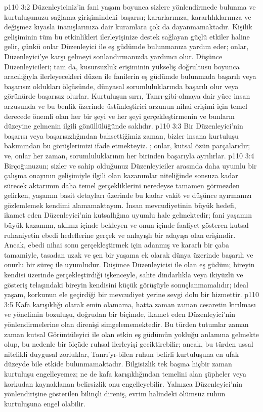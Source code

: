 \vs p110 3:2 Düzenleyiciniz’in fani yaşam boyunca sizlere yönlendirmede bulunma ve kurtuluşunuzu sağlama girişimindeki başarısı; kararlarınıza, kararlılıklarınıza ve değişmez  kıyasla inanışlarınıza dair kuramlara çok da dayanmamaktadır. Kişilik gelişiminin tüm bu etkinlikleri ilerleyişinize destek sağlayan güçlü etkiler haline gelir, çünkü onlar Düzenleyici ile eş güdümde bulunmanıza yardım eder; onlar, Düzenleyici’ye karşı gelmeyi sonlandırmanızda yardımcı olur. Düşünce Düzenleyicileri; tam da, kusursuzluk erişiminin yükseliş doğrultusu boyunca aracılığıyla ilerleyecekleri düzen ile fanilerin eş güdümde bulunmada başarılı veya başarısız oldukları ölçüsünde, dünyasal sorumluluklarında başarılı olur veya görünürde başarısız olurlar. Kurtuluşun sırrı, Tanrı\hyp{}gibi\hyp{}olmaya dair yüce insan arzusunda ve bu benlik üzerinde üstünleştirici arzunun nihai erişimi için temel derecede önemli olan her bir şeyi ve her şeyi gerçekleştirmenin ve bunların düzeyine gelmenin ilgili gönüllülüğünde saklıdır.
\vs p110 3:3 Bir Düzenleyici’nin başarısı veya başarısızlığından bahsettiğimiz zaman, bizler insana kurtuluşu bakımından bu görüşlerimizi ifade etmekteyiz. ; onlar, kutsal özün parçalarıdır; ve, onlar her zaman, sorumluluklarının her birinden başarıyla ayrılırlar.
\vs p110 3:4 Birçoğunuzun; sizler ve sahip olduğunuz Düzenleyiciler arasında daha uyumlu bir çalışma onayının gelişimiyle ilgili olan kazanımlar niteliğinde sonsuza kadar sürecek aktarımın daha temel gerçekliklerini neredeyse tamamen görmezden gelirken, yaşamın basit detayları üzerinde bu kadar vakit ve düşünce ayırmanızı gözlemlemek kendimi alamamaktayım. İnsan mevcudiyetinin büyük hedefi, ikamet eden Düzenleyici’nin kutsallığına uyumlu hale gelmektedir; fani yaşamın büyük kazanımı, aklınız içinde bekleyen ve onun içinde faaliyet gösteren kutsal ruhaniyetin ebedi hedeflerine gerçek ve anlayışlı bir adayışa olan erişimdir. Ancak, ebedi nihai sonu gerçekleştirmek için adanmış ve kararlı bir çaba tamamiyle, tasadan uzak ve şen bir yaşama ek olarak dünya üzerinde başarılı ve onurlu bir süreç ile uyumludur. Düşünce Düzenleyicisi ile olan eş güdüm; bireyin kendisi üzerinde gerçekleştirdiği işkenceyle, sahte dindarlıkla veya ikiyüzlü ve gösteriş telaşındaki bireyin kendisini küçük görüşüyle sonuçlanmamalıdır; ideal yaşam, korkunun ele geçirdiği bir mevcudiyet yerine sevgi dolu bir hizmettir.
\vs p110 3:5 Kafa karışıklığı olarak emin olamama, hatta zaman zaman cesaretin kırılması ve yönelimin bozuluşu, doğrudan bir biçimde, ikamet eden Düzenleyici’nin yönlendirmelerine olan direnişi simgelememektedir. Bu türden tutumlar zaman zaman kutsal Görüntüleyici ile olan etkin eş güdümün yokluğu anlamına gelmekte olup, bu nedenle bir ölçüde ruhsal ilerleyişi geciktirebilir; ancak, bu türden ussal nitelikli duygusal zorluklar, Tanrı’yı\hyp{}bilen ruhun belirli kurtuluşuna en ufak düzeyde bile etkide bulunmamaktadır. Bilgisizlik tek başına hiçbir zaman kurtuluşu engelleyemez; ne de kafa karışıklığından temelini alan şüpheler veya korkudan kaynaklanan belirsizlik onu engelleyebilir. Yalnızca Düzenleyici’nin yönlendirişine gösterilen bilinçli direniş, evrim halindeki ölümsüz ruhun kurtuluşuna engel olabilir.

